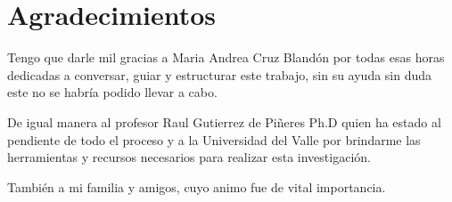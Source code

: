 \chapter*{Agradecimientos}

Tengo que darle mil gracias a Maria Andrea Cruz Blandón por todas esas horas dedicadas a conversar, guiar y estructurar este trabajo, sin su ayuda sin duda este no se habría podido llevar a cabo.

De igual manera al profesor Raul Gutierrez de Piñeres Ph.D quien ha estado al pendiente de todo el proceso y a la Universidad del Valle por brindarme las herramientas y recursos necesarios para realizar esta investigación.

También a mi familia y amigos, cuyo animo fue de vital importancia.